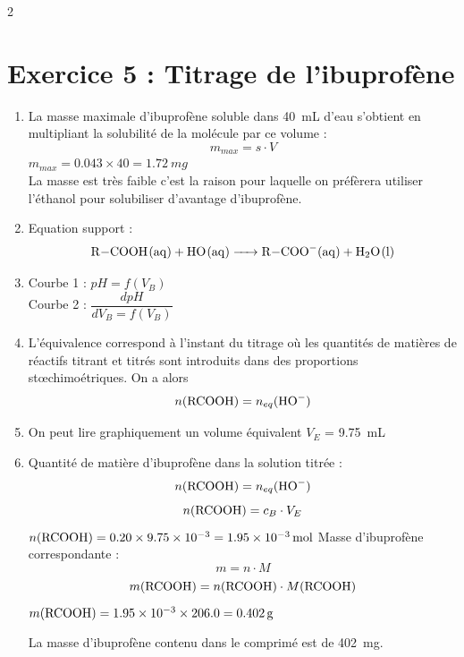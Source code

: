 \documentclass[a4paper,11pt,fleqn]{article}%
\begin{document}
\begin{multicols}{2}
\section*{Exercice 5 : Titrage de l'ibuprofène}
\begin{enumerate}
	\item La masse maximale d'ibuprofène soluble dans \SI{40}{mL} d'eau s'obtient en multipliant la solubilité de la molécule par ce volume : $$m_{max} = s \cdot V$$
	 $m_{max} = \num{0.043} \times 40 = \SI{1.72}{mg}$\\
	La masse est très faible c'est la raison pour laquelle on préfèrera utiliser l'éthanol pour solubiliser d'avantage d'ibuprofène.
	\item Equation support : $$\ce{R-COOH(aq) + HO_(aq) -> R-COO-(aq)  + H2O(l)}$$
	\item Courbe 1 : $pH=f(V_B)$ \\ Courbe 2 : $\dfrac{dpH}{dV_B = f(V_B)}$
	\item L'équivalence correspond à l'instant du titrage où les quantités de matières de réactifs titrant et titrés sont introduits dans des proportions st\oe chimoétriques. On a alors $$n(\ce{RCOOH}) = n_{eq}(\ce{HO-})$$
	\item On peut lire graphiquement un volume équivalent $V_E$ = \SI{9.75}{mL}
	\item Quantité de matière d'ibuprofène dans la solution titrée :
	$$n(\ce{RCOOH}) = n_{eq}(\ce{HO-})$$
	$$n(\ce{RCOOH}) =c_B \cdot V_E$$
 $n(\ce{RCOOH}) = \num{0.20} \times \num{9.75E-3} = \SI{1.95E-3}{\mol}$
Masse d'ibuprofène correspondante :
$$m=n \cdot M$$
$$m(\ce{RCOOH}) = n(\ce{RCOOH}) \cdot M(\ce{RCOOH})$$
 $m(\ce{RCOOH}) =\num{1.95E-3} \times \num{206.0} =\SI{0.402}{g} $

La masse d'ibuprofène contenu dans le comprimé est de \SI{402}{mg}.
	
\end{enumerate}
\end{multicols}
\end{document}
